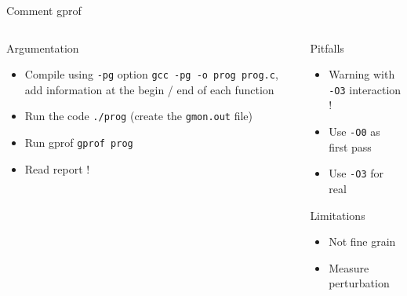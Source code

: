 %
\begin{Frame}{Comment gprof}
  \begin{columns}[t]
    \begin{column}{5cm} %
      \begin{block}{Argumentation}
        \begin{itemize}
        \item Compile using \texttt{-pg} option
          \texttt{gcc -pg -o prog prog.c}, add information at the
          begin / end of each function
        \item Run the code \texttt{./prog}
          (create the \texttt{gmon.out} file)
        \item Run gprof \texttt{gprof prog}
        \item Read report !
        \end{itemize}
      \end{block} 
    \end{column}
    
    \begin{column}{5cm} %
      \begin{block}{Pitfalls}
        \begin{itemize}
        \item Warning with \texttt{-O3} interaction !
        \item Use \texttt{-O0} as first pass
        \item Use \texttt{-O3} for real
        \end{itemize}
      \end{block}   
      \begin{alertblock}{Limitations}
        \begin{itemize}
        \item Not fine grain
        \item Measure perturbation
        \end{itemize}
      \end{alertblock}
    \end{column}
  \end{columns}  
\end{Frame}


